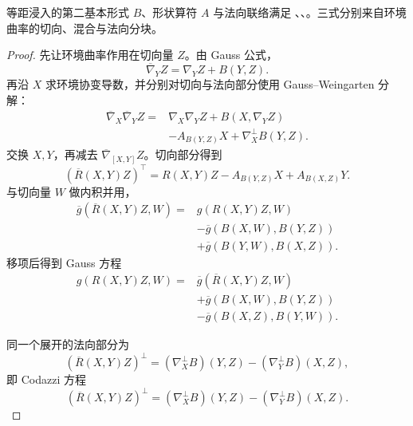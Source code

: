 \begin{theorem}
等距浸入的第二基本形式 $B$、形状算符 $A$ 与法向联络满足 、、。三式分别来自环境曲率的切向、混合与法向分块。
\end{theorem}

\begin{proof}
先让环境曲率作用在切向量 $Z$。由 Gauss 公式，
\[
\overline\nabla_YZ
=\nabla_YZ+B(Y,Z).
\]
再沿 $X$ 求环境协变导数，并分别对切向与法向部分使用 Gauss--Weingarten 分解：
\[
\begin{aligned}
\overline\nabla_X\overline\nabla_YZ
={}&\nabla_X\nabla_YZ+B(X,\nabla_YZ)\\
&-A_{B(Y,Z)}X
+\nabla_X^\perp B(Y,Z).
\end{aligned}
\]
交换 $X,Y$，再减去 $\overline\nabla_{[X,Y]}Z$。切向部分得到
\[
(\overline R(X,Y)Z)^\top
=R(X,Y)Z
-A_{B(Y,Z)}X+A_{B(X,Z)}Y.
\]
与切向量 $W$ 做内积并用，
\[
\begin{aligned}
\overline g(\overline R(X,Y)Z,W)
={}&g(R(X,Y)Z,W)\\
&-\overline g(B(X,W),B(Y,Z))\\
&+\overline g(B(Y,W),B(X,Z)).
\end{aligned}
\]
移项后得到 Gauss 方程
\begin{equation}\label{eq:math-dg-gauss-general}
\boxed{
\begin{aligned}
g(R(X,Y)Z,W)
={}&\overline g(\overline R(X,Y)Z,W)\\
&+\overline g(B(X,W),B(Y,Z))\\
&-\overline g(B(X,Z),B(Y,W)).
\end{aligned}}
\end{equation}

同一个展开的法向部分为
\[
(\overline R(X,Y)Z)^\perp
=(\nabla_X^\perp B)(Y,Z)
-(\nabla_Y^\perp B)(X,Z),
\]
即 Codazzi 方程
\begin{equation}\label{eq:math-dg-codazzi-general}
\boxed{
(\overline R(X,Y)Z)^\perp
=(\nabla_X^\perp B)(Y,Z)
-(\nabla_Y^\perp B)(X,Z).}
\end{equation}


\end{proof}
